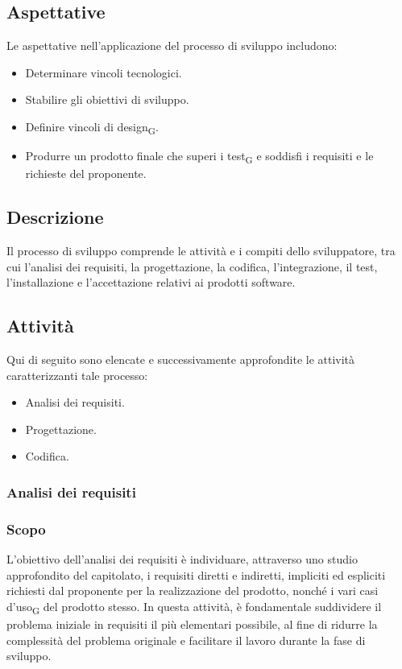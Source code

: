 \documentclass{article}
\begin{document}
\subsection{Aspettative}
Le aspettative nell'applicazione del processo di sviluppo includono:
\begin{itemize}
    \item Determinare vincoli tecnologici.
    \item Stabilire gli obiettivi di sviluppo.
    \item Definire vincoli di design\textsubscript{G}.
    \item Produrre un prodotto finale che superi i test\textsubscript{G} e soddisfi i requisiti e le richieste del proponente.
\end{itemize}

\subsection{Descrizione}
Il processo di sviluppo comprende le attività e i compiti dello sviluppatore, tra cui l'analisi dei requisiti, la progettazione, la codifica, l'integrazione, il test, l'installazione e l'accettazione relativi ai prodotti software.

\subsection{Attività}
Qui di seguito sono elencate e successivamente approfondite le attività caratterizzanti tale processo:
\begin{itemize}
    \item Analisi dei requisiti.
    \item Progettazione.
    \item Codifica.
\end{itemize}
\subsubsection{Analisi dei requisiti}
\subsubsection*{Scopo}
L'obiettivo dell'analisi dei requisiti è individuare, attraverso uno studio approfondito del capitolato, i requisiti diretti e indiretti, impliciti ed espliciti richiesti dal proponente per la realizzazione del prodotto, nonché i vari casi d'uso\textsubscript{G} del prodotto stesso. In questa attività, è fondamentale suddividere il problema iniziale in requisiti il più elementari possibile, al fine di ridurre la complessità del problema originale e facilitare il lavoro durante la fase di sviluppo.
\end{document}
